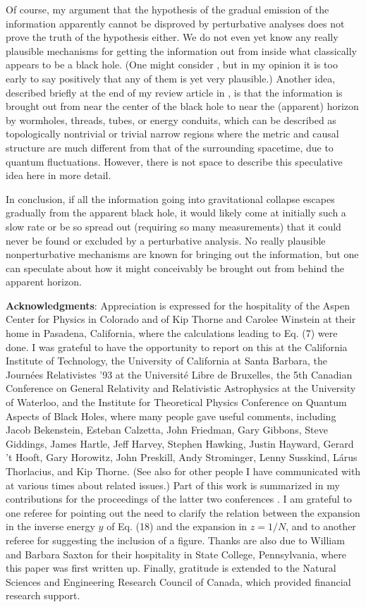	Of course, my argument that the hypothesis of the gradual
emission of the information apparently cannot be disproved by
perturbative analyses does not prove the truth of the hypothesis
either.  We do not even yet know any really plausible
mechanisms for getting the information out from inside what
classically appears to be a black hole.  (One might consider
\cite{Hoo,BekSch,uni2DBH,STU}, but in my opinion it is too early
to say positively that any of them is yet very plausible.)
Another idea, described briefly at the end of my review article
in \cite{Pag93}, is that the information is brought out from near
the center of the black hole to near the (apparent) horizon by
wormholes, threads, tubes, or energy conduits, which can
be described as topologically nontrivial or trivial narrow regions
where the metric and causal structure are much different from
that of the surrounding spacetime, due to quantum fluctuations.
However, there is not space to describe this speculative idea
here in more detail.

	In conclusion, if all the information going into
gravitational
collapse escapes gradually from the apparent black hole, it
would likely come at initially such a slow rate or
be so spread out (requiring so many measurements)
that it could never be found or excluded by a perturbative analysis.
No really plausible nonperturbative mechanisms are known for
bringing out the information, but one can speculate about how it
might conceivably be brought out from behind the apparent horizon.

\newpage
	{\bf Acknowledgments}:  Appreciation is expressed for
the hospitality of the Aspen Center for Physics in Colorado
and of Kip Thorne and Carolee Winstein at their home in Pasadena,
California, where the calculations leading to Eq. (7) were done.
I was grateful to have the opportunity to report on this at
the California Institute of Technology, the
University of California at Santa Barbara, the Journ\'{e}es
Relativistes
'93 at the Universit\'{e} Libre de Bruxelles, the 5th Canadian
Conference on General Relativity and Relativistic Astrophysics
at the University of Waterloo, and the Institute for Theoretical
Physics Conference on Quantum Aspects of Black Holes,
where many people gave useful comments,
including Jacob Bekenstein, Esteban Calzetta,
John Friedman, Gary Gibbons, Steve Giddings, James Hartle,
Jeff Harvey, Stephen Hawking, Justin Hayward, Gerard 't Hooft,
Gary Horowitz, John Preskill, Andy Strominger, Lenny Susskind,
L\'{a}rus Thorlacius, and Kip Thorne.  (See also \cite{Pag93} for
other
people I have communicated with at various times about related
issues.)
Part of this work is summarized in my contributions
for the proceedings of the latter two conferences \cite{Brux,Pag93}.
I am grateful to one referee for pointing out the need
to clarify the relation between the expansion in the
inverse energy $y$ of Eq. (18) and the expansion in
$z=1/N$, and to another referee for suggesting
the inclusion of a figure.
Thanks are also due to William and Barbara Saxton
for their hospitality in State College, Pennsylvania,
where this paper was first written up.
Finally, gratitude is extended to the
Natural Sciences and Engineering Research Council of
Canada, which provided financial research support.

